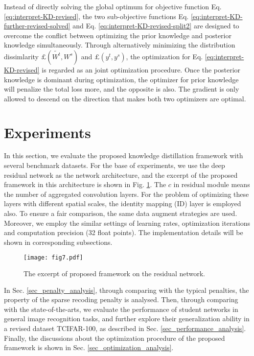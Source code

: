 \documentclass[10pt,twocolumn,letterpaper]{article}
\begin{document}
Instead of directly solving the global optimum
for objective function Eq. \ref{eq:interpret-KD-revised},
the two sub-objective functions
Eq. \ref{eq:interpret-KD-further-revised-solved}
and Eq. \ref{eq:interpret-KD-revised-split2}
are designed to
overcome the conflict between
optimizing the prior knowledge and posterior knowledge simultaneously.
Through alternatively minimizing the
distribution dissimlarity $\pounds(\tilde{W^t}, W^s)$
and $\pounds(y^{t}, y^{s})$,
the optimization for Eq. \ref{eq:interpret-KD-revised} is regarded as
an joint optimization procedure.
Once the posterior knowledge is dominant during optimization,
the optimizer for prior knowledge will penalize the total loss more,
and the opposite is also.
The gradient is only allowed to descend
on the direction that makes both two optimizers are optimal.

\section{Experiments}
In this section,
we evaluate the proposed knowledge distillation framework with several benchmark datasets.
For the base of experiments,
we use the deep residual network \cite{he2016deep}
as the network architecture,
and the excerpt of the proposed framework in this architecture
is shown in Fig. \ref{fig:residual_module}.
The $c$ in residual module means the number of aggregated convolution layers.
For the problem of optimizing these layers with different spatial scales,
the identity mapping (ID) layer \cite{Yu2018Learning} is employed also.
To ensure a fair comparison,
the same data augment strategies are used.
Moreover,
we employ the similar settings of learning rates,
optimization iterations and
computation precision (32 float points).
The implementation details
will be shown in corresponding subsections.

\begin{figure}[htb]
  \centering
  \texttt{[image: fig7.pdf]}
  \caption{The excerpt of proposed framework on the residual network.}
  \label{fig:residual_module}
\end{figure}

In Sec. \ref{sec_penalty_analysis},
through comparing with the typical penalties,
the property of the sparse recoding penalty is analysed.
Then,
through comparing with the state-of-the-arts,
we evaluate the performance of student networks in general image recognition tasks,
and further explore their generalization ability in a revised dataset TCIFAR-100,
as described in Sec. \ref{sec_performance_analysis}.
Finally,
the discussions about the optimization procedure of the proposed framework is shown in Sec. \ref{sec_optimization_analysis}.
\end{document}

